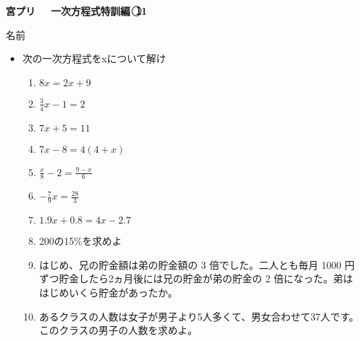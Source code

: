 \documentclass[a4paper,fleqn,papersize,15pt]{jsarticle}
\begin{document}
\clearpage
 \begin{center}
   \LARGE\textbf{宮プリ　~一次方程式特訓編~\textcircled{\scriptsize 11}}
     \begin{flushright}
       名前\underline{\hspace{8zw}}
     \end{flushright}
 \end{center}

 \begin{itemize}
   \item 次の一次方程式をxについて解け
   \begin{enumerate}
\item $8x=2x+9$ \begin{flushright}\framebox[8em]{\rule{0pt}{6ex}}\end{flushright} %
\item $\frac{3}{4} x-1=2$ \begin{flushright}\framebox[8em]{\rule{0pt}{6ex}}\end{flushright} %
\item $7x+5=11$ \begin{flushright}\framebox[8em]{\rule{0pt}{6ex}}\end{flushright} %
\item $7x-8=4(4+x)$ \begin{flushright}\framebox[8em]{\rule{0pt}{6ex}}\end{flushright} %
\item $\frac{x}{8} -2= \frac{9-x}{6}$ \begin{flushright}\framebox[8em]{\rule{0pt}{6ex}}\end{flushright} %
\item $- \frac{7}{9} x= \frac{28}{3}$ \begin{flushright}\framebox[8em]{\rule{0pt}{6ex}}\end{flushright} %
\item $1.9x+0.8=4x-2.7$ \begin{flushright}\framebox[8em]{\rule{0pt}{6ex}}\end{flushright} %
\item 200の15\%を求めよ \vfill \begin{flushright}\framebox[8em]{\rule{0pt}{6ex}}\end{flushright} %
\item はじめ、兄の貯金額は弟の貯金額の 3 倍でした。二人とも毎月 1000 円ずつ貯金したら2ヵ月後には兄の貯金が弟の貯金の 2 倍になった。弟ははじめいくら貯金があったか。 \vfill \begin{flushright}\framebox[8em]{\rule{0pt}{6ex}}\end{flushright} %
\item あるクラスの人数は女子が男子より5人多くて、男女合わせて37人です。このクラスの男子の人数を求めよ。 \vfill \begin{flushright}\framebox[8em]{\rule{0pt}{6ex}}\end{flushright} %
\end{enumerate}
    \vfill
\end{itemize}
\end{document}
